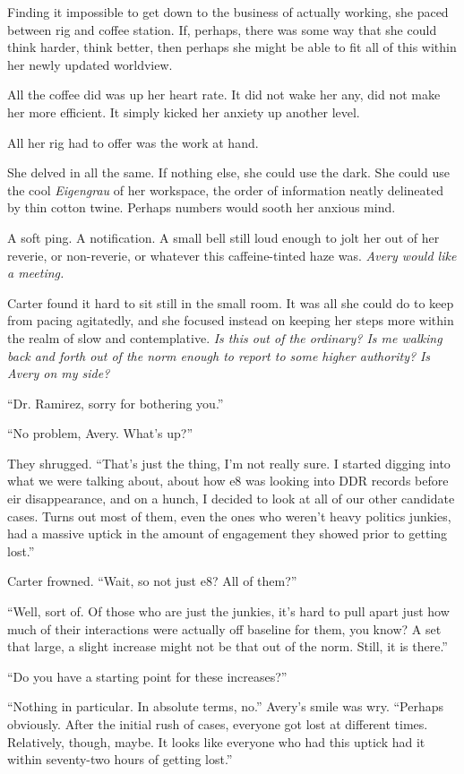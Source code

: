 Finding it impossible to get down to the business of actually working, she paced between rig and coffee station. If, perhaps, there was some way that she could think harder, think better, then perhaps she might be able to fit all of this within her newly updated worldview.

All the coffee did was up her heart rate. It did not wake her any, did not make her more efficient. It simply kicked her anxiety up another level.

All her rig had to offer was the work at hand.

She delved in all the same. If nothing else, she could use the dark. She could use the cool \emph{Eigengrau} of her workspace, the order of information neatly delineated by thin cotton twine. Perhaps numbers would sooth her anxious mind.

A soft ping. A notification. A small bell still loud enough to jolt her out of her reverie, or non-reverie, or whatever this caffeine-tinted haze was. \emph{Avery would like a meeting.}

Carter found it hard to sit still in the small room. It was all she could do to keep from pacing agitatedly, and she focused instead on keeping her steps more within the realm of slow and contemplative. \emph{Is this out of the ordinary? Is me walking back and forth out of the norm enough to report to some higher authority?} \emph{Is Avery on my side?}

``Dr. Ramirez, sorry for bothering you.''

``No problem, Avery. What's up?''

They shrugged. ``That's just the thing, I'm not really sure. I started digging into what we were talking about, about how e8 was looking into DDR records before eir disappearance, and on a hunch, I decided to look at all of our other candidate cases. Turns out most of them, even the ones who weren't heavy politics junkies, had a massive uptick in the amount of engagement they showed prior to getting lost.''

Carter frowned. ``Wait, so not just e8? All of them?''

``Well, sort of. Of those who are just the junkies, it's hard to pull apart just how much of their interactions were actually off baseline for them, you know? A set that large, a slight increase might not be that out of the norm. Still, it is there.''

``Do you have a starting point for these increases?''

``Nothing in particular. In absolute terms, no.'' Avery's smile was wry. ``Perhaps obviously. After the initial rush of cases, everyone got lost at different times. Relatively, though, maybe. It looks like everyone who had this uptick had it within seventy-two hours of getting lost.''

